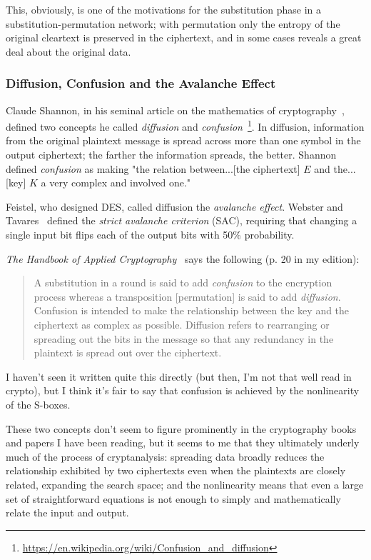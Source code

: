 \documentclass[%
 aip,
 jmp,%
 amsmath,amssymb,
 reprint,%
]{revtex4-1}
\begin{document}
This, obviously, is one of the motivations for the substitution phase
in a substitution-permutation network; with permutation only the
entropy of the original cleartext is preserved in the ciphertext, and
in some cases reveals a great deal about the original data.

\subsubsection{Diffusion, Confusion and the Avalanche Effect}
\label{sec:diffusion}

Claude Shannon, in his seminal article on the mathematics of
cryptography~\cite{shannon45}, defined two concepts he called
\emph{diffusion} and \emph{confusion}~\footnote{\url{https://en.wikipedia.org/wiki/Confusion_and_diffusion}}.  In diffusion, information from
the original plaintext message is spread across more than one symbol
in the output ciphertext; the farther the information spreads, the
better.  Shannon defined \emph{confusion} as making "the relation
between...[the ciphertext] $E$ and the...[key] $K$ a very complex and
involved one."

Feistel, who designed DES, called diffusion the \emph{avalanche
  effect}.  Webster and Tavares~\cite{webster86:avalanche} defined the
\emph{strict avalanche criterion} (SAC), requiring that changing a
single input bit flips each of the output bits with 50\% probability.

\emph{The Handbook of Applied Cryptography}~\cite{menezes1996handbook}
says the following (p. 20 in my edition):

\begin{quote}
A substitution in a round is said to add \emph{confusion} to the
encryption process whereas a transposition [permutation] is said to
add \emph{diffusion}. Confusion is intended to make the relationship
between the key and the ciphertext as complex as possible.  Diffusion
refers to rearranging or spreading out the bits in the message so that
any redundancy in the plaintext is spread out over the ciphertext.
\end{quote}

I haven't seen it written quite this directly (but then, I'm not that
well read in crypto), but I think it's fair to say that confusion is
achieved by the nonlinearity of the S-boxes.

These two concepts don't seem to figure prominently in the
cryptography books and papers I have been reading, but it seems to me
that they ultimately underly much of the process of cryptanalysis:
spreading data broadly reduces the relationship exhibited by two
ciphertexts even when the plaintexts are closely related, expanding
the search space; and the nonlinearity means that even a large set of
straightforward equations is not enough to simply and mathematically
relate the input and output.
\end{document}
